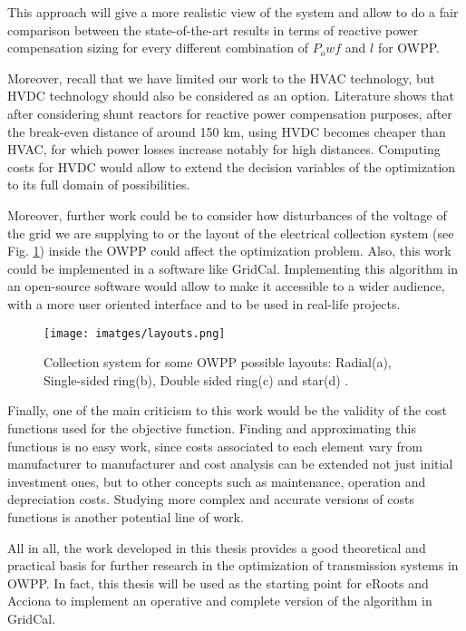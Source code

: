 \documentclass[a4paper,11pt, titlepage, twoside]{article}
\begin{document}
This approach will give a more realistic view of the system and allow to do a fair comparison between the state-of-the-art results in terms of reactive power compensation sizing for every different combination of $P_owf$ and $l$ for OWPP. \par

Moreover, recall that we have limited our work to the HVAC technology, but HVDC technology should also be considered as an option.
Literature \cite{paperbase} shows that after considering shunt reactors for reactive power compensation purposes, after the break-even distance of around 150 km,
using HVDC becomes cheaper than HVAC, for which power losses increase notably for high distances. Computing costs for HVDC would allow to extend the decision variables of the optimization to its full
domain of possibilities.\par

Moreover, further work could be to consider how disturbances of the voltage of the grid we are supplying to or the layout of the electrical collection system (see Fig. \ref{layouts_shape}) inside the OWPP could affect the optimization problem. 
Also, this work could be implemented in a software like GridCal. Implementing this algorithm in an open-source software would allow to make it accessible to a wider audience, with a more user oriented interface and to be used in real-life projects.

\begin{figure}[H]
    \centering
    \texttt{[image: imatges/layouts.png]}
    \caption{Collection system for some OWPP possible layouts: Radial(a), Single-sided ring(b), Double sided ring(c) and star(d) \cite{layouts_coll}.}
    \label{layouts_shape}
\end{figure}

Finally, one of the main criticism to this work would be the validity of the cost functions used for the objective function. Finding and approximating this functions is no easy work,
since costs associated to each element vary from manufacturer to manufacturer and cost analysis can be extended not just initial investment ones, but to other concepts such as maintenance, operation and depreciation costs. Studying more complex and accurate 
versions of costs functions is another potential line of work.\par

All in all, the work developed in this thesis provides a good theoretical and practical basis for further research in the optimization of transmission systems in OWPP. In fact, this thesis will be used as the starting point for eRoots and Acciona to implement an operative and complete version of the algorithm in GridCal.
\end{document}
